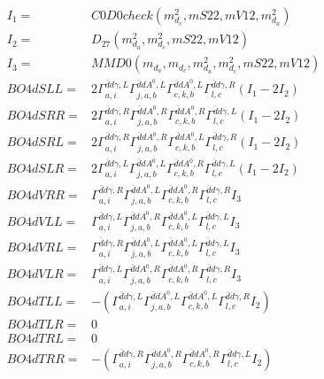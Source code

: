 \documentclass[A4,landscape]{article}
\begin{document}
\begin{align} 
I_1 = & C0D0check(m^2_{d_{{c}}}, mS22, mV12, m^2_{d_{{a}}}) \\ 
I_2 = & D_{27}(m^2_{d_{{a}}}, m^2_{d_{{c}}}, mS22, mV12) \\ 
I_3 = & MMD0(m_{d_{{a}}}, m_{d_{{c}}}, m^2_{d_{{a}}}, m^2_{d_{{c}}}, mS22, mV12) \\ 
  BO4dSLL= & 2  \Gamma^{\bar{d}d \gamma ,L}_{a, i} \Gamma^{\bar{d}d A^0 ,L}_{j, a, b} \Gamma^{\bar{d}d A^0 ,L}_{c, k, b} \Gamma^{\bar{d}d \gamma ,R}_{l, c} (I_1 - 2 I_2) \\ 
  BO4dSRR= & 2  \Gamma^{\bar{d}d \gamma ,R}_{a, i} \Gamma^{\bar{d}d A^0 ,R}_{j, a, b} \Gamma^{\bar{d}d A^0 ,R}_{c, k, b} \Gamma^{\bar{d}d \gamma ,L}_{l, c} (I_1 - 2 I_2) \\ 
  BO4dSRL= & 2  \Gamma^{\bar{d}d \gamma ,R}_{a, i} \Gamma^{\bar{d}d A^0 ,R}_{j, a, b} \Gamma^{\bar{d}d A^0 ,L}_{c, k, b} \Gamma^{\bar{d}d \gamma ,R}_{l, c} (I_1 - 2 I_2) \\ 
  BO4dSLR= & 2  \Gamma^{\bar{d}d \gamma ,L}_{a, i} \Gamma^{\bar{d}d A^0 ,L}_{j, a, b} \Gamma^{\bar{d}d A^0 ,R}_{c, k, b} \Gamma^{\bar{d}d \gamma ,L}_{l, c} (I_1 - 2 I_2) \\ 
  BO4dVRR= &  \Gamma^{\bar{d}d \gamma ,R}_{a, i} \Gamma^{\bar{d}d A^0 ,L}_{j, a, b} \Gamma^{\bar{d}d A^0 ,R}_{c, k, b} \Gamma^{\bar{d}d \gamma ,R}_{l, c} I_3 \\ 
  BO4dVLL= &  \Gamma^{\bar{d}d \gamma ,L}_{a, i} \Gamma^{\bar{d}d A^0 ,R}_{j, a, b} \Gamma^{\bar{d}d A^0 ,L}_{c, k, b} \Gamma^{\bar{d}d \gamma ,L}_{l, c} I_3 \\ 
  BO4dVRL= &  \Gamma^{\bar{d}d \gamma ,R}_{a, i} \Gamma^{\bar{d}d A^0 ,L}_{j, a, b} \Gamma^{\bar{d}d A^0 ,L}_{c, k, b} \Gamma^{\bar{d}d \gamma ,L}_{l, c} I_3 \\ 
  BO4dVLR= &  \Gamma^{\bar{d}d \gamma ,L}_{a, i} \Gamma^{\bar{d}d A^0 ,R}_{j, a, b} \Gamma^{\bar{d}d A^0 ,R}_{c, k, b} \Gamma^{\bar{d}d \gamma ,R}_{l, c} I_3 \\ 
  BO4dTLL= & -( \Gamma^{\bar{d}d \gamma ,L}_{a, i} \Gamma^{\bar{d}d A^0 ,L}_{j, a, b} \Gamma^{\bar{d}d A^0 ,L}_{c, k, b} \Gamma^{\bar{d}d \gamma ,R}_{l, c} I_2) \\ 
  BO4dTLR= & 0 \\ 
  BO4dTRL= & 0 \\ 
  BO4dTRR= & -( \Gamma^{\bar{d}d \gamma ,R}_{a, i} \Gamma^{\bar{d}d A^0 ,R}_{j, a, b} \Gamma^{\bar{d}d A^0 ,R}_{c, k, b} \Gamma^{\bar{d}d \gamma ,L}_{l, c} I_2) \\ 
\end{align} 
\end{document}
